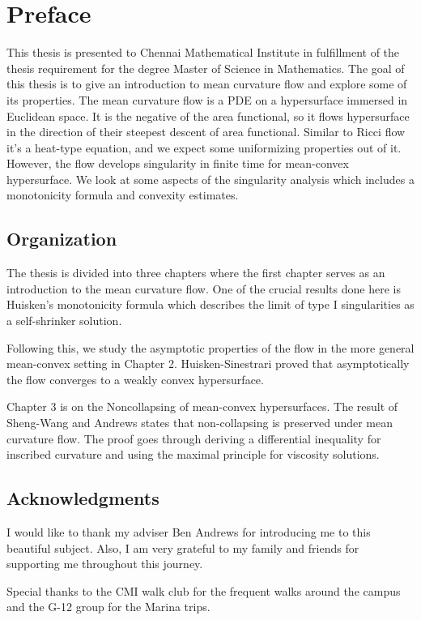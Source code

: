 \chapter{Preface}

      This thesis is presented to Chennai Mathematical Institute in fulfillment of the thesis
      requirement for the degree Master of Science in Mathematics. The goal of this thesis is to give an introduction to mean curvature flow and explore some of its properties. The mean curvature flow is a PDE on a hypersurface immersed in Euclidean space. It is the negative of the area functional, so it flows hypersurface in the direction of their steepest descent of area functional. Similar to Ricci flow it's a heat-type equation, and we expect some uniformizing properties out of it. However, the flow develops singularity in finite time for mean-convex hypersurface. We look at some aspects of the singularity analysis which includes a monotonicity formula and convexity estimates.  %


\section*{Organization}
      
      The thesis is divided into three chapters where the first chapter serves as an introduction to the mean curvature flow. One of the crucial results done here is Huisken's monotonicity formula which describes the limit of type I singularities as a self-shrinker solution.  
      
      Following this, we study the asymptotic properties of the flow in the more general mean-convex setting in Chapter 2. Huisken-Sinestrari proved that asymptotically the flow converges to a weakly convex hypersurface.
      
      Chapter 3 is on the Noncollapsing of mean-convex hypersurfaces. The result of Sheng-Wang and Andrews states that non-collapsing is preserved under mean curvature flow. The proof goes through deriving a differential inequality for inscribed curvature and using the maximal principle for viscosity solutions. 

\section*{Acknowledgments}

I would like to thank my adviser Ben Andrews for introducing me to this beautiful subject. Also, I am very grateful to my family and friends for supporting me throughout this journey.

Special thanks to the CMI walk club for the frequent walks around the campus and the G-12 group for the Marina trips. 